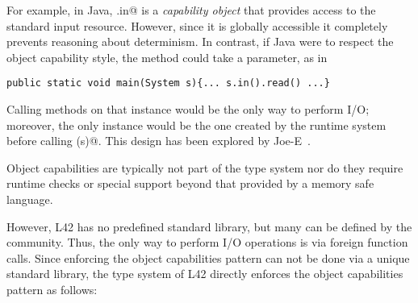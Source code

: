 \lstset{language=Java}
 For example, in Java, \Q@System.in@%
 \lstset{language=FortyThree}
 is a \emph{capability object} that provides access to the standard input resource. However, since it is globally accessible it completely prevents reasoning about determinism. 
In contrast, if Java were to respect the object capability style, the \Q@main@ method could take a \Q@System@ parameter, as in
\lstset{language=Java}
\begin{lstlisting}
public static void main(System s){... s.in().read() ...}
\end{lstlisting}
\lstset{language=FortyThree}
Calling methods on that \Q@System@ instance would be the only way to perform I/O;
moreover, the only \Q@System@ instance would be the one created by the runtime system before calling \Q@main(s)@. %
This design has been explored by Joe-E~\cite{finifter2008verifiable}.


Object capabilities are typically not part of the type system nor do they require runtime checks or special support beyond that provided by a memory safe language. 

However, L42 has no predefined standard library, but many can be defined by the community.
Thus, the only way to perform I/O operations is via foreign function calls.
Since enforcing the object capabilities pattern can not be done via a unique standard library, the type system of L42 directly enforces the object capabilities pattern as follows:


